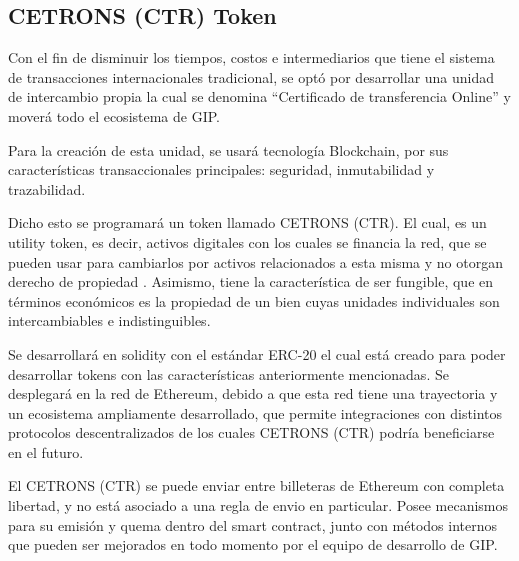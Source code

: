\subsection{CETRONS (CTR) Token}
Con el fin de disminuir los tiempos, costos e intermediarios que tiene el sistema de transacciones internacionales tradicional, se optó por desarrollar una unidad de intercambio propia la cual se denomina “Certificado de transferencia Online”  y moverá todo el ecosistema de GIP. 

Para la creación de esta unidad, se usará tecnología Blockchain, por sus características transaccionales principales: seguridad, inmutabilidad y trazabilidad.

Dicho esto se programará un token llamado CETRONS (CTR). El cual, es un utility token, es decir,  activos digitales con los cuales se financia la red, que se pueden usar para cambiarlos por activos relacionados a esta misma y no otorgan derecho de propiedad \cite{utility}. Asimismo, tiene la característica de ser fungible, que en términos económicos es la propiedad de un bien cuyas unidades individuales son intercambiables e indistinguibles\cite{fungible}.

Se desarrollará en solidity con el estándar ERC-20 el cual está creado para poder desarrollar tokens con las características anteriormente mencionadas\cite{eips20}. Se desplegará en la red de Ethereum, debido a que esta red tiene una trayectoria y un ecosistema ampliamente desarrollado, que permite integraciones con distintos protocolos descentralizados de los cuales CETRONS (CTR) podría beneficiarse en el futuro.

El CETRONS (CTR) se puede enviar entre billeteras de Ethereum con completa libertad, y no está asociado a una regla de envio en particular. Posee mecanismos para su emisión y quema dentro del smart contract, junto con métodos internos que pueden ser mejorados en todo momento por el equipo de desarrollo de GIP.
